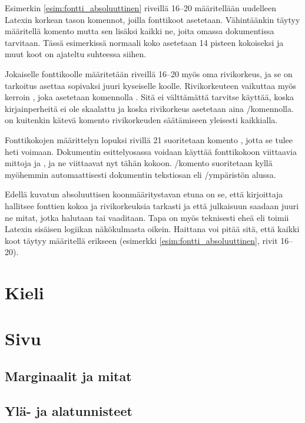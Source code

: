 \begin{koodilohkosis}
  \sffamilyabs\fontsize{16pt}{18pt}\bfseries
\end{koodilohkosis}

Esimerkin \ref{esim:fontti_absoluuttinen} riveillä 16--20 määritellään
uudelleen Latexin korkean tason komennot, joilla fonttikoot asetetaan.
Vähintäänkin täytyy määritellä komento  mutta
sen lisäksi kaikki ne, joita omassa dokumentissa tarvitaan. Tässä
esimerkissä normaali koko asetetaan 14 pisteen kokoiseksi ja muut koot
on ajateltu suhteessa siihen.

Jokaiselle fonttikoolle määritetään riveillä 16--20 myös oma
rivikorkeus, ja se on tarkoitus asettaa sopivaksi juuri kyseiselle
koolle. Rivikorkeuteen vaikuttaa myös kerroin , joka asetetaan komennolla .
Sitä ei välttämättä tarvitse käyttää, koska kirjainperheitä ei ole
skaalattu ja koska rivikorkeus asetetaan aina \-/komennolla.  on kuitenkin kätevä
komento rivikorkeuden säätämiseen yleisesti kaikkialla.

Fonttikokojen määrittelyn lopuksi rivillä 21 suoritetaan komento
, jotta se tulee heti voimaan. Dokumentin
esittely\-osassa voidaan käyttää fonttikokoon viittaavia mittoja
 ja , ja ne viittaavat nyt tähän kokoon.
\-/komento suoritetaan kyllä myöhemmin
automaattisesti dokumentin teksti\-osan eli
\-/ympäristön alussa.

Edellä kuvatun absoluuttisen koonmääritystavan etuna on se, että
kirjoittaja hallitsee fonttien kokoa ja rivikorkeuksia tarkasti ja että
julkaisuun saadaan juuri ne mitat, jotka halutaan tai vaaditaan. Tapa on
myös teknisesti eheä eli toimii Latexin sisäisen logiikan näkökulmasta
oikein. Haittana voi pitää sitä, että kaikki koot täytyy määritellä
erikseen (esimerkki \ref{esim:fontti_absoluuttinen}, rivit 16--20).

\section{Kieli}
\label{luku:kieliasetukset}
\section{Sivu}
\label{luku:sivuasetukset}
\subsection{Marginaalit ja mitat}
\subsection{Ylä- ja alatunnisteet}

